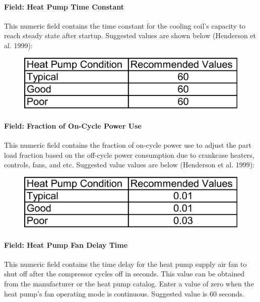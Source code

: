\paragraph{Field: Heat Pump Time Constant}\label{field-heat-pump-time-constant-1}

This numeric field contains the time constant for the cooling coil's capacity to reach steady state after startup. Suggested values are shown below (Henderson et al. 1999):

\begin{figure}[htbp]
\centering
\includegraphics{media/image306.png}
\caption{}
\end{figure}

\paragraph{Field: Fraction of On-Cycle Power Use}\label{field-fraction-of-on-cycle-power-use-1}

This numeric field contains the fraction of on-cycle power use to adjust the part load fraction based on the off-cycle power consumption due to crankcase heaters, controls, fans, and etc. Suggested value values are below (Henderson et al. 1999):

\begin{figure}[htbp]
\centering
\includegraphics{media/image307.png}
\caption{}
\end{figure}

\paragraph{Field: Heat Pump Fan Delay Time}\label{field-heat-pump-fan-delay-time-1}

This numeric field contains the time delay for the heat pump supply air fan to shut off after the compressor cycles off in seconds. This value can be obtained from the manufacturer or the heat pump catalog. Enter a value of zero when the heat pump's fan operating mode is continuous. Suggested value is 60 seconds.

